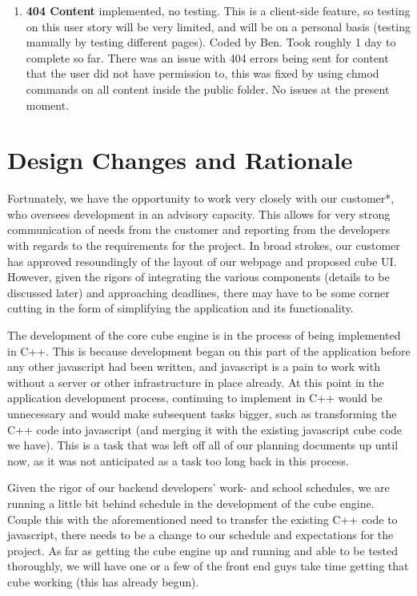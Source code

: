 \documentclass[12pt]{article}
\begin{document}
\begin{enumerate}
	\item \textbf{404 Content} implemented, no testing. This is a client-side feature, so testing on this user story will be very limited, and will be on a personal basis (testing manually by testing different pages). Coded by Ben. Took roughly 1 day to complete so far. There was an issue with 404 errors being sent for content that the user did not have permission to, this was fixed by using chmod commands on all content inside the public folder. No issues at the present moment.
\end{enumerate}
	

\section{Design Changes and Rationale}

\par Fortunately, we have the opportunity to work very closely with our customer*, who oversees development in an advisory capacity. This allows for very strong communication of needs from the customer and reporting from the developers with regards to the requirements for the project. In broad strokes, our customer has approved resoundingly of the layout of our webpage and proposed cube UI. However, given the rigors of integrating the various components (details to be discussed later) and approaching deadlines, there may have to be some corner cutting in the form of simplifying the application and its functionality. \\

\par The development of the core cube engine is in the process of being implemented in C++. This is because development began on this part of the application before any other javascript had been written, and javascript is a pain to work with without a server or other infrastructure in place already. At this point in the application development process, continuing to implement in C++ would be unnecessary and would make subsequent tasks bigger, such as transforming the C++ code into javascript (and merging it with the existing javascript cube code we have). This is a task that was left off all of our planning documents up until now, as it was not anticipated as a task too long back in this process. \\

\par Given the rigor of our backend developers’ work- and school schedules, we are running a little bit behind schedule in the development of the cube engine. Couple this with the aforementioned need to transfer the existing C++ code to javascript, there needs to be a change to our schedule and expectations for the project. As far as getting the cube engine up and running and able to be tested thoroughly, we will have one or a few of the front end guys take time getting that cube working (this has already begun). \\
\end{document}

